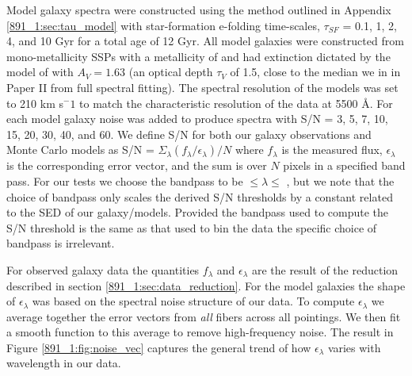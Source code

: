 Model galaxy spectra were constructed using the method outlined in
Appendix \ref{891_1:sec:tau_model} with star-formation e-folding
time-scales, $\tau_{SF}$ = 0.1, 1, 2, 4, and 10 Gyr for a total age of
12 Gyr.  All model galaxies were constructed from mono-metallicity
SSPs with a metallicity of  and had extinction
dictated by the model of \citet{Charlot00} with $A_V=1.63$ (an optical
depth $\tau_V$ of 1.5, close to the median we in in Paper II from full
spectral fitting). The spectral resolution of the models was set to
210 km s${^-1}$ to match the characteristic resolution of the data at
5500 \AA. For each model galaxy noise was added to produce spectra
with S/N = 3, 5, 7, 10, 15, 20, 30, 40, and 60. We define S/N for both
our galaxy observations and Monte Carlo models as S/N =
$\Sigma_{\lambda}\left(f_\lambda/\epsilon_\lambda\right)/N$ where
$f_\lambda$ is the measured flux, $\epsilon_\lambda$ is the
corresponding error vector, and the sum is over $N$ pixels in a
specified band pass. For our tests we choose the bandpass to be
 $\leq \lambda \leq$ , but we note that
the choice of bandpass only scales the derived S/N thresholds by a
constant related to the SED of our galaxy/models. Provided the
bandpass used to compute the S/N threshold is the same as that used to
bin the data the specific choice of bandpass is irrelevant.

For observed galaxy data the quantities $f_\lambda$ and
$\epsilon_\lambda$ are the result of the reduction described in
section \ref{891_1:sec:data_reduction}. For the model galaxies the shape of
$\epsilon_\lambda$ was based on the spectral noise structure of our
data.  To compute $\epsilon_\lambda$ we average together the error
vectors from \emph{all} fibers across all pointings. We then fit a
smooth function to this average to remove high-frequency noise. The
result in Figure \ref{891_1:fig:noise_vec} captures the general trend of how
$\epsilon_\lambda$ varies with wavelength in our data.




